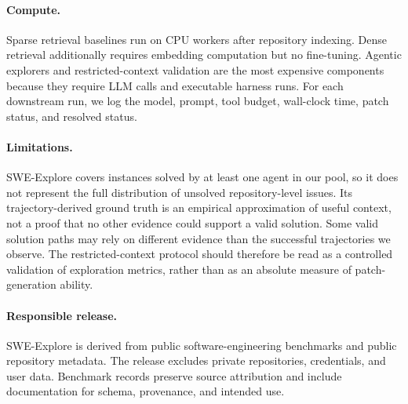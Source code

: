 \paragraph{Compute.}
Sparse retrieval baselines run on CPU workers after repository indexing. Dense
retrieval additionally requires embedding computation but no fine-tuning.
Agentic explorers and restricted-context validation are the most expensive
components because they require LLM calls and executable harness runs. For each
downstream run, we log the model, prompt, tool budget, wall-clock time, patch
status, and resolved status.

\paragraph{Limitations.}
SWE-Explore covers instances solved by at least one agent in our pool, so it does
not represent the full distribution of unsolved repository-level issues. Its
trajectory-derived ground truth is an empirical approximation of useful context,
not a proof that no other evidence could support a valid solution. Some valid
solution paths may rely on different evidence than the successful trajectories we
observe. The restricted-context protocol should therefore be read as a controlled
validation of exploration metrics, rather than as an absolute measure of
patch-generation ability.

\paragraph{Responsible release.}
SWE-Explore is derived from public software-engineering benchmarks and public
repository metadata. The release excludes private repositories, credentials, and
user data. Benchmark records preserve source attribution and include
documentation for schema, provenance, and intended use.

